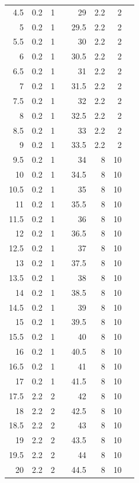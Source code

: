 \begin{table}
\begin{center}
\begin{tabular}[ht]{rrrr|rrrr}
      4.5 & 0.2 & 1 & & 29 & 2.2 & 2 & \\
        5 & 0.2 & 1 & & 29.5 & 2.2 & 2 & \\
      5.5 & 0.2 & 1 & & 30 & 2.2 & 2 & \\
        6 & 0.2 & 1 & & 30.5 & 2.2 & 2 & \\
      6.5 & 0.2 & 1 & & 31 & 2.2 & 2 & \\
        7 & 0.2 & 1 & & 31.5 & 2.2 & 2 & \\
      7.5 & 0.2 & 1 & & 32 & 2.2 & 2 & \\
        8 & 0.2 & 1 & & 32.5 & 2.2 & 2 & \\
      8.5 & 0.2 & 1 & & 33 & 2.2 & 2 & \\
        9 & 0.2 & 1 & & 33.5 & 2.2 & 2 & \\
      9.5 & 0.2 & 1 & & 34 & 8 & 10 & \\
       10 & 0.2 & 1 & & 34.5 & 8 & 10 & \\
     10.5 & 0.2 & 1 & & 35 & 8 & 10 & \\
       11 & 0.2 & 1 & & 35.5 & 8 & 10 & \\
     11.5 & 0.2 & 1 & & 36 & 8 & 10 & \\
       12 & 0.2 & 1 & & 36.5 & 8 & 10 & \\
     12.5 & 0.2 & 1 & & 37 & 8 & 10 & \\
       13 & 0.2 & 1 & & 37.5 & 8 & 10 & \\
     13.5 & 0.2 & 1 & & 38 & 8 & 10 & \\
       14 & 0.2 & 1 & & 38.5 & 8 & 10 & \\
     14.5 & 0.2 & 1 & & 39 & 8 & 10 & \\
       15 & 0.2 & 1 & & 39.5 & 8 & 10 & \\
     15.5 & 0.2 & 1 & & 40 & 8 & 10 & \\
       16 & 0.2 & 1 & & 40.5 & 8 & 10 & \\
     16.5 & 0.2 & 1 & & 41 & 8 & 10 & \\
       17 & 0.2 & 1 & & 41.5 & 8 & 10 & \\
     17.5 & 2.2 & 2 & & 42 & 8 & 10 & \\
       18 & 2.2 & 2 & & 42.5 & 8 & 10 & \\
     18.5 & 2.2 & 2 & & 43 & 8 & 10 & \\
       19 & 2.2 & 2 & & 43.5 & 8 & 10 & \\
     19.5 & 2.2 & 2 & & 44 & 8 & 10 & \\
       20 & 2.2 & 2 & & 44.5 & 8 & 10 & \\

\end{tabular}
\end{center}
\end{table}
